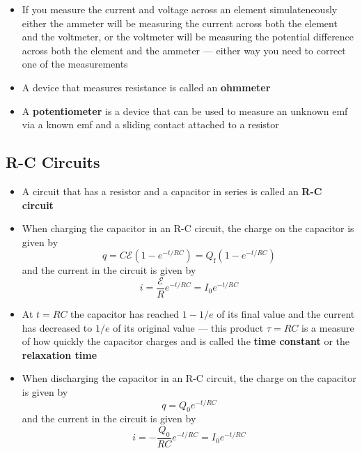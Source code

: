 \documentclass{article}
\begin{document}
\begin{itemize}
  \item If you measure the current and voltage across an element simulateneously either the ammeter will be measuring the current across both the element and the voltmeter, or the voltmeter will be measuring the potential difference across both the element and the ammeter — either way you need to correct one of the measurements

  \item A device that measures resistance is called an \textbf{ohmmeter}

  \item A \textbf{potentiometer} is a device that can be used to measure an unknown emf via a known emf and a sliding contact attached to a resistor
\end{itemize}

\subsection{R-C Circuits}

\begin{itemize}
  \item A circuit that has a resistor and a capacitor in series is called an \textbf{R-C circuit}

  \item When charging the capacitor in an R-C circuit, the charge on the capacitor is given by \[q = C \mathcal{E} (1 - e^{-t / R C}) = Q_\textrm{f} (1 - e^{-t / R C})\] and the current in the circuit is given by \[i = \frac{\mathcal{E}}{R} e^{-t / R C} = I_0 e^{-t / R C}\]

  \item At $t = R C$ the capacitor has reached $1 - 1 / e$ of its final value and the current has decreased to $1 / e$ of its original value — this product $\tau = R C$ is a measure of how quickly the capacitor charges and is called the \textbf{time constant} or the \textbf{relaxation time}

  \item When discharging the capacitor in an R-C circuit, the charge on the capacitor is given by \[q = Q_0 e^{-t / R C}\] and the current in the circuit is given by \[i = -\frac{Q_0}{R C} e^{-t / R C} = I_0 e^{-t / R C}\]
\end{itemize}
\end{document}
